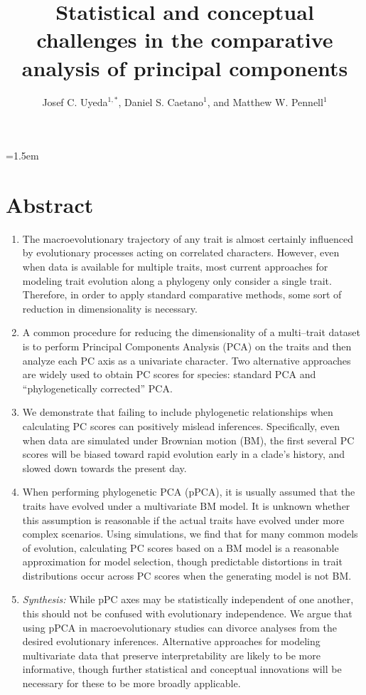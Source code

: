 \documentclass[a4paper,12pt]{article}
\title{Statistical and conceptual challenges in the comparative analysis of principal components}
\author{
Josef C. Uyeda$^{1,*}$, Daniel S. Caetano$^1$, and Matthew W. Pennell$^1$
}
\date{}
\affiliation{
 $^{1}$ Department of Biological Sciences \& Institute for Bioinformatics and Evolutionary Studies, University of Idaho, Moscow, ID 83844, U.S.A.\\ 
 $^{*}$ Email for correspondence: \texttt{pseudacris@gmail.com}\\
}
\begin{document}
\mstitlepage
\parindent=1.5em
\addtolength{\parskip}{.3em}
\vfill

\section{Abstract}
\begin{enumerate}
\item The macroevolutionary trajectory of any trait is almost certainly influenced by evolutionary processes acting on correlated characters. However, even when data is available for multiple traits, most current approaches for modeling trait evolution along a phylogeny only consider a single trait. Therefore, in order to apply standard comparative methods, some sort of reduction in dimensionality is necessary.

\item A common procedure for reducing the dimensionality of a multi--trait dataset is to perform Principal Components Analysis (PCA) on the traits and then analyze each PC axis as a univariate character. Two alternative approaches are widely used to obtain PC scores for species: standard PCA and ``phylogenetically corrected'' PCA. 

\item We demonstrate that failing to include phylogenetic relationships when calculating PC scores can positively mislead inferences. Specifically, even when data are simulated under Brownian motion (BM), the first several PC scores will be biased toward rapid evolution early in a clade's history, and slowed down towards the present day.

\item When performing phylogenetic PCA (pPCA), it is usually assumed that the traits have evolved under a multivariate BM model. It is unknown whether this assumption is reasonable if the actual traits have evolved under more complex scenarios. Using simulations, we find that for many common models of evolution, calculating PC scores based on a BM model is a reasonable approximation for model selection, though predictable distortions in trait distributions occur across PC scores when the generating model is not BM.

\item \emph{Synthesis:} While pPC axes may be statistically independent of one another, this should not be confused with evolutionary independence. We argue that using pPCA in macroevolutionary studies can divorce analyses from the desired evolutionary inferences. Alternative approaches for modeling multivariate data that preserve interpretability are likely to be more informative, though further statistical and conceptual innovations will be necessary for these to be more broadly applicable.
\end{enumerate} 
\end{document}
